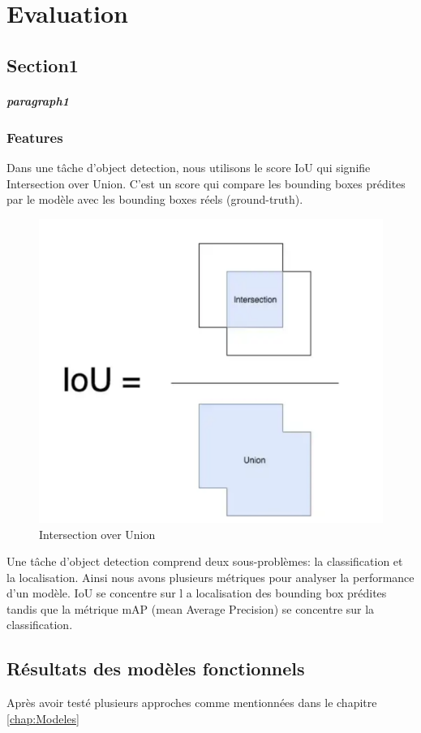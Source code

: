 \chapter{Evaluation}
\label{chap:Evaluation}

\section{Section1}
\paragraph{paragraph1}
\subsection{Features}
Dans une tâche d'object detection, nous utilisons le score IoU qui signifie Intersection over Union.
C'est un score qui compare les bounding boxes prédites par le modèle avec les bounding boxes réels (ground-truth).
\begin{figure}[tbh!]
    \centering
    \includegraphics[width=\textwidth]{images/iou.png}
    \caption{Intersection over Union}
    \label{fig:iou}
\end{figure}
Une tâche d'object detection comprend deux sous-problèmes: la classification et la localisation.
Ainsi nous avons plusieurs métriques pour analyser la performance d'un modèle. IoU se concentre sur l
a localisation des bounding box prédites tandis que la métrique mAP (mean Average Precision) 
se concentre sur la classification.





\section{Résultats des modèles fonctionnels}

Après avoir testé plusieurs approches comme mentionnées dans le chapitre \autoref{chap:Modeles}
